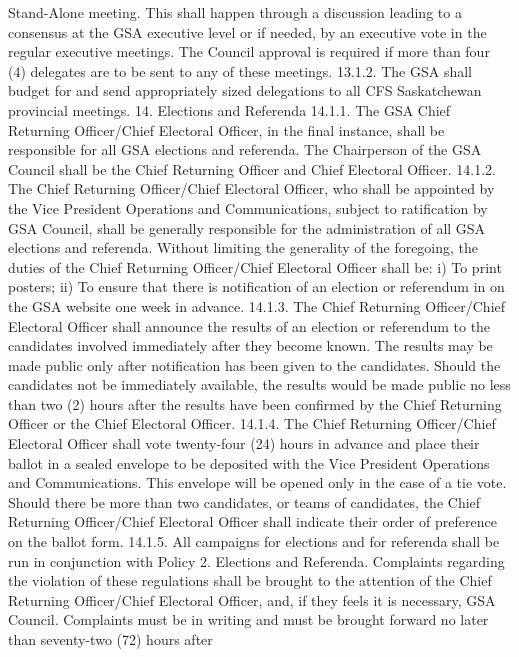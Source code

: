 \documentclass{article}
\begin{document}
Stand-Alone meeting. This shall happen through a discussion leading 
to a consensus at the GSA executive level or if needed, by an 
executive vote in the regular executive meetings. The Council 
approval is required if more than four (4) delegates are to be sent to 
any of these meetings. 
13.1.2. The GSA shall budget for and send appropriately sized delegations 
to all CFS Saskatchewan provincial meetings. 
14. Elections and Referenda 
14.1.1. The GSA Chief Returning Officer/Chief Electoral Officer, in the 
final instance, shall be responsible for all GSA elections and referenda. 
The Chairperson of the GSA Council shall be the Chief Returning 
Officer and Chief Electoral Officer. 
14.1.2. The Chief Returning Officer/Chief Electoral Officer, who shall be 
appointed by the Vice President Operations and Communications, 
subject to ratification by GSA Council, shall be generally responsible 
for the administration of all GSA elections and referenda. Without 
limiting the generality of the foregoing, the duties of the Chief 
Returning Officer/Chief Electoral Officer shall be: 
i) To print posters; 
ii) To ensure that there is notification of an election or referendum in on 
the GSA website one week in advance. 
14.1.3. The Chief Returning Officer/Chief Electoral Officer shall announce 
the results of an election or referendum to the candidates involved 
immediately after they become known. The results may be made public only after notification has been given to the candidates. Should 
the candidates not be immediately available, the results would be made 
public no less than two (2) hours after the results have been confirmed 
by the Chief Returning Officer or the Chief Electoral Officer. 
14.1.4. The Chief Returning Officer/Chief Electoral Officer shall vote 
twenty-four (24) hours in advance and place their ballot in a sealed 
envelope to be deposited with the Vice President Operations and 
Communications. This envelope will be opened only in the case of a 
tie vote. Should there be more than two candidates, or teams of 
candidates, the Chief Returning Officer/Chief Electoral Officer shall 
indicate their order of preference on the ballot form. 
14.1.5. All campaigns for elections and for referenda shall be run in 
conjunction with Policy 2. Elections and Referenda. Complaints 
regarding the violation of these regulations shall be brought to the 
attention of the Chief Returning Officer/Chief Electoral Officer, and, if 
they feels it is necessary, GSA Council. Complaints must be in writing 
and must be brought forward no later than seventy-two (72) hours after 
\end{document}
